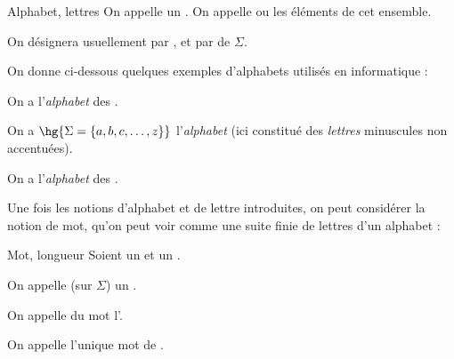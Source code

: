 \documentclass[a4paper,french,bookmarks]{book}
\begin{document}
    \begin{definition}{Alphabet, lettres}{}
        On appelle  un . On appelle  ou  les éléments de cet ensemble.
    \end{definition}
    \begin{notation}
        On désignera usuellement par , et par  de $\Sigma$.
    \end{notation}
    
    On donne ci-dessous quelques exemples d'alphabets utilisés en informatique :
    
    \begin{example}{}{}
        \begin{enumerate}
            \itt On a  l'\textit{alphabet} des .
            
            \itt On a $\hg{\Sigma = \ens{a, b, c, \dots, z}}$ l'\textit{alphabet}  (ici constitué des \textit{lettres} minuscules non accentuées).
            
            \itt On a l'\textit{alphabet} des .
        \end{enumerate}
    \end{example}
    
    Une fois les notions d'alphabet et de lettre introduites, on peut considérer la notion de mot, qu'on peut voir comme une suite finie de lettres d'un alphabet :
    
    \begin{definition}{Mot, longueur}{}
        Soient \hg{$\Sigma$} un  et  un .
        \begin{enumerate}
            \itast On appelle  (sur $\Sigma$) un .
            
            \itast On appelle  du mot  l'.
            
            \itast On appelle  l'unique mot  de .
        \end{enumerate}
    \end{definition}
    
\end{document}
